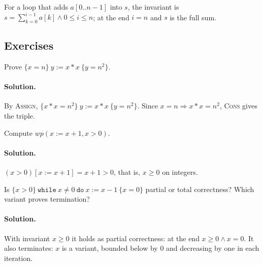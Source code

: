 For a loop that adds $a[0..n-1]$ into $s$, the invariant is
$s = \sum_{k=0}^{i-1} a[k] \wedge 0 \le i \le n$; at the end $i = n$ and $s$ is the full sum.

\subsection{Exercises}

\begin{exercise}
Prove $\{x = n\}\ y := x * x\ \{y = n^2\}$.
\end{exercise}

\paragraph{Solution.} By \textsc{Assign}, $\{x * x = n^2\}\ y := x * x\ \{y = n^2\}$.
Since $x = n \Rightarrow x * x = n^2$, \textsc{Cons} gives the triple.

\begin{exercise}
Compute $\mathit{wp}(x := x + 1, x > 0)$.
\end{exercise}

\paragraph{Solution.} $(x > 0)[x := x + 1] = x + 1 > 0$, that is, $x \ge 0$ on integers.

\begin{exercise}
Is $\{x > 0\}\ \mathtt{while}\ x \ne 0\ \mathtt{do}\ x := x - 1\ \{x = 0\}$ partial or total
correctness? Which variant proves termination?
\end{exercise}

\paragraph{Solution.} With invariant $x \ge 0$ it holds as partial correctness:
at the end $x \ge 0 \wedge x = 0$. It also terminates: $x$ is a variant, bounded
below by 0 and decreasing by one in each iteration.
